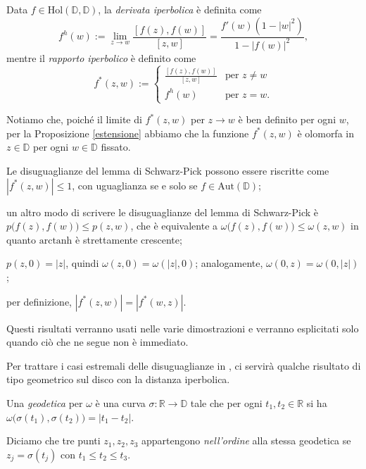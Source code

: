 \begin{defn}
  Data $f \in \text{Hol}(\mathbb{D},\mathbb{D})$, la \textit{derivata iperbolica} è definita come
  $$f^h(w):=\lim_{z \longrightarrow w} \frac{[f(z),f(w)]}{[z,w]}=\frac{f'(w)(1-|w|^2)}{1-|f(w)|^2},$$
  mentre il \textit{rapporto iperbolico} è definito come
  $$f^*(z,w):=\begin{cases}
    \frac{[f(z),f(w)]}{[z,w]} & \mbox{per }z\not=w \\
    f^h(w) & \mbox{per }z=w.
  \end{cases}$$
\end{defn}

Notiamo che, poiché il limite di $f^*(z,w)$ per $z \longrightarrow w$ è ben definito per ogni $w$, per la Proposizione \ref{estensione} abbiamo che la funzione $f^*(z,w)$ è olomorfa in $z \in \mathbb{D}$ per ogni $w \in \mathbb{D}$ fissato.

\begin{oss} \label{oss1}
  \begin{nlist}
    \item Le disuguaglianze del lemma di Schwarz-Pick possono essere riscritte come $|f^*(z,w)| \le 1$, con uguaglianza se e solo se $f \in \text{Aut}(\mathbb{D})$;
    \item  un altro modo di scrivere le disuguaglianze del lemma di Schwarz-Pick è $p\bigl(f(z),f(w)\bigr) \le p(z,w)$, che è equivalente a $\omega\bigl(f(z),f(w)\bigr) \le \omega(z,w)$ in quanto $\text{arctanh}$ è strettamente crescente;
    \item $p(z,0)=|z|$, quindi $\omega(z,0)=\omega(|z|,0)$; analogamente, $\omega(0,z)=\omega(0,|z|)$;
    \item per definizione, $|f^*(z,w)|=|f^*(w,z)|$.
  \end{nlist}
  Questi risultati verranno usati nelle varie dimostrazioni e verranno esplicitati solo quando ciò che ne segue non è immediato.
\end{oss}

Per trattare i casi estremali delle disuguaglianze in \cite{BM}, ci servirà qualche risultato di tipo geometrico sul disco con la distanza iperbolica.

\begin{defn}
  Una \textit{geodetica} per $\omega$ è una curva $\sigma: \mathbb{R} \longrightarrow \mathbb{D}$ tale che per ogni $t_1,t_2 \in \mathbb{R}$ si ha $\omega\bigl(\sigma(t_1),\sigma(t_2)\bigr)=|t_1-t_2|$.

  Diciamo che tre punti $z_1, z_2, z_3$ appartengono \textit{nell'ordine} alla stessa geodetica se $z_j=\sigma(t_j)$ con $t_1 \le t_2 \le t_3$.
\end{defn}

